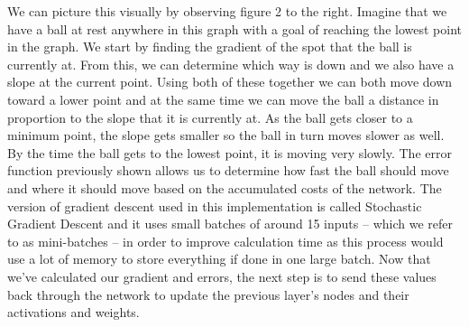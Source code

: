 \documentclass[12pt]{article}
\theoremstyle{definition}
\theoremstyle{plain}
\begin{document}
We can picture this visually by observing figure 2 to the right. Imagine that we have a ball at rest anywhere in this graph with a goal of reaching the lowest point in the graph. We start by finding the gradient of the spot that the ball is currently at. From this, we can determine which way is down and we also have a slope at the current point. Using both of these together we can both move down toward a lower point and at the same time we can move the ball a distance in proportion to the slope that it is currently at. As the ball gets closer to a minimum point, the slope gets smaller so the ball in turn moves slower as well. By the time the ball gets to the lowest point, it is moving very slowly. The error function previously shown allows us to determine how fast the ball should move and where it should move based on the accumulated costs of the network. The version of gradient descent used in this implementation is called Stochastic Gradient Descent and it uses small batches of around 15 inputs \--- which we refer to as mini-batches \--- in order to improve calculation time as this process would use a lot of memory to store everything if done in one large batch. Now that we've calculated our gradient and errors, the next step is to send these values back through the network to update the previous layer's nodes and their activations and weights.
\end{document}
